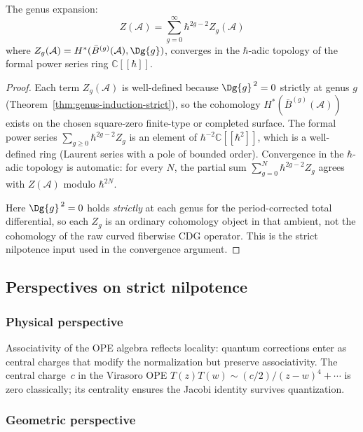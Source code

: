 \begin{corollary}\label{cor:genus-expansion-converges}
The genus expansion:
\begin{equation}
Z(\mathcal{A}) = \sum_{g=0}^\infty \hbar^{2g-2} Z_g(\mathcal{A})
\end{equation}
where $Z_g(\mathcal{A}) = H^*(\bar{B}^{(g)}(\mathcal{A}), \Dg{g})$, converges in the
$\hbar$-adic topology of the formal power series ring $\mathbb{C}[[\hbar]]$.
\end{corollary}

\begin{proof}
Each term $Z_g(\mathcal{A})$ is well-defined because
$\Dg{g}^{\,2} = 0$ strictly at genus $g$
(Theorem~\ref{thm:genus-induction-strict}), so the cohomology
$H^*(\bar{B}^{(g)}(\mathcal{A}))$ exists on the chosen square-zero
finite-type or completed surface.
The formal power series $\sum_{g \geq 0} \hbar^{2g-2} Z_g$ is an element of
$\hbar^{-2} \mathbb{C}[[\hbar^2]]$, which is a well-defined ring (Laurent series
with a pole of bounded order). Convergence in the $\hbar$-adic topology is
automatic: for every $N$, the partial sum $\sum_{g=0}^N \hbar^{2g-2} Z_g$
agrees with $Z(\mathcal{A})$ modulo $\hbar^{2N}$.

Here $\Dg{g}^{\,2} = 0$ holds \emph{strictly} at each genus for
the period-corrected total differential, so each $Z_g$ is an ordinary
cohomology object in that ambient, not the cohomology of the raw curved
fiberwise CDG operator. This is the strict nilpotence input used in the
convergence argument.
\end{proof}

\subsection{Perspectives on strict nilpotence}

\subsubsection{Physical perspective}

Associativity of the OPE algebra reflects locality: quantum
corrections enter as central charges that modify the normalization
but preserve associativity. The central charge~$c$ in the
Virasoro OPE $T(z)T(w) \sim (c/2)/(z-w)^4 + \cdots$ is zero
classically; its centrality ensures the Jacobi identity survives
quantization.

\subsubsection{Geometric perspective}

